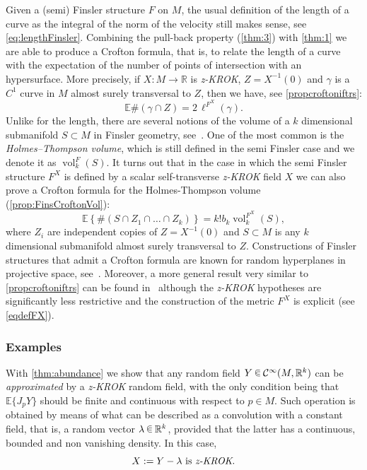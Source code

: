 \documentclass[10pt]{amsart}
\theoremstyle{definition}\newtheorem{defi}[theo]{Definition}\newtheorem{rema}[theo]{Remark}\newtheorem{exam}[theo]{Example}\newtheorem{exem}[theo]{Example}\newtheorem{nota}[theo]{Notation}
\newcommand{\R}{\mathbb{R}}
\newcommand{\EE}{\mathbb{E}}
\DeclareMathOperator{\vol}{vol}
\newcommand{\mC}{\mathcal{C}}
\newcommand{\zkrok}{\emph{z-KROK}\xspace}
\newcommand{\uball}{b}
\newcommand*\randin{
\mathchoice {\raisebox{-.35ex}{$\displaystyle{^\subset}$}\mkern-11.5mu\raisebox{+.45ex}{$\displaystyle{_\subset}$}} {\mkern+1mu\raisebox{-.27ex}{$\textstyle{^\subset}$}\mkern-11.7mu\raisebox{+.45ex}{$\textstyle{_\subset}$}} {\raisebox{.35ex}{$\scriptstyle\subset$}\mkern-14mu\raisebox{-.15ex}{$\scriptstyle\subset$}} {\raisebox{.3ex}{$\scriptscriptstyle\subset$}\mkern-13.5mu\raisebox{-.10ex}{$\scriptscriptstyle\subset$}}}
\begin{document}
Given a (semi) Finsler structure $F$ on $M$, the usual definition of the length of a curve as the integral of the norm of the velocity still makes sense, see \eqref{eq:lengthFinsler}. Combining the pull-back property (\cref{thm:3}) with \cref{thm:1} we are able to produce a Crofton formula, that is, to relate the length of a curve with the expectation of the number of points of intersection with an hypersurface. More precisely, if $X:M\to\R$ is \zkrok, $Z=X^{-1}(0)$ and $\gamma$ is a $C^1$ curve in $M$ almost surely transversal to $Z$, then we have, see \cref{propcroftoniftrs}:
\begin{equation*}
\EE\#(\gamma\cap Z)=2\,\ell^{F^X}(\gamma).
\end{equation*}
Unlike for the length, there are several notions of the volume of a $k$ dimensional submanifold $S\subset M$ in Finsler geometry, see~\cite{volumesFinsler}. One of the most common is the \emph{Holmes--Thompson volume}, which is still defined in the semi Finsler case and we denote it as $\vol^F_k(S)$. It turns out that in the case in which the semi Finsler structure $F^X$ is defined by a scalar self-transverse \zkrok field $X$ we can also prove a Crofton formula for the Holmes-Thompson volume (\cref{prop:FinsCroftonVol}):
\begin{equation*}
\EE\left\{\#(S\cap Z_1\cap \dots \cap Z_k)\right\}=k! \uball_k \vol_k^{F^{X}}(S),
\end{equation*}
where $Z_i$ are independent copies of $Z=X^{-1}(0)$ and $S\subset M$ is any $k$ dimensional submanifold almost surely transversal to $Z$. Constructions of Finsler structures that admit a Crofton formula are known for random hyperplanes in projective space, see~\cite{BernigCrofton,PaivaGelfCrof,
SchneiderCrofton}. Moreover, a more general result very similar to \cref{propcroftoniftrs} can be found in~\cite[Theorem~A]{paivageod} although the {\zkrok} hypotheses are significantly less restrictive and the construction of the metric $F^X$ is explicit (see \eqref{eqdefFX}).


\subsubsection{Examples}\label{ex:introabu}

With \cref{thm:abundance} we show that any random field ${Y\,\randin\,}\mC^\infty(M,\R^k)$ can be \emph{approximated} by a {\zkrok} random field, with the only condition being that $\EE\{J_pY\}$ should be finite and continuous with respect to $p\in M$. Such operation is obtained by means of what can be described as a convolution with a constant field, that is, a random vector $\lambda \,\randin\, \R^k$, provided that the latter has a continuous, bounded and non vanishing density. In this case,
\begin{equation}\label{eq:perturb}
X:= Y-\lambda \text{ is \zkrok.}
\end{equation}
\end{document}

